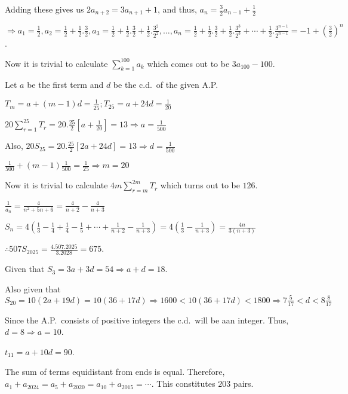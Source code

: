  Adding these gives us $2a_{n + 2} = 3a_{n + 1} + 1$, and thus, $a_n = \frac{3}{2}a_{n - 1} + \frac{1}{2}$

  $\Rightarrow a_1 = \frac{1}{2}, a_2 = \frac{1}{2} + \frac{1}{2}.\frac{3}{2}, a_3 = \frac{1}{2}
  + \frac{1}{2}.\frac{3}{2} + \frac{1}{2}.\frac{3^2}{2^2}, \ldots, a_n = \frac{1}{2}
  + \frac{1}{2}.\frac{3}{2} + \frac{1}{2}.\frac{3^3}{2^3} + \cdots + \frac{1}{2}.\frac{3^{n - 1}}{2^{n - 1}}
  = -1 + \left(\frac{3}{2}\right)^n$.

  Now it is trivial to calculate $\displaystyle\sum_{k = 1}^{100}a_k$ which comes out to be $3a_{100} -
  100$.
\item Let $a$ be the first term and $d$ be the c.d.\ of the given A.P.

  $T_m = a + (m - 1)d = \frac{1}{25}; T_{25} = a + 24d = \frac{1}{20}$

  $20\displaystyle\sum_{r = 1}^{25}T_r = 20.\frac{25}{2}\left[a + \frac{1}{20}\right] = 13\Rightarrow a
  = \frac{1}{500}$

  Also, $20S_{25} = 20.\frac{25}{2}[2a + 24d] = 13 \Rightarrow d = \frac{1}{500}$

  $\frac{1}{500} + (m - 1)\frac{1}{500} = \frac{1}{25}\Rightarrow m = 20$

  Now it is trivial to calculate $4m\displaystyle\sum_{r = m}^{2m}T_r$ which turns out to be $126$.
\item $\frac{1}{a_n} = \frac{4}{n^2 + 5n + 6} = \frac{4}{n + 2} - \frac{4}{n + 3}$

  $S_n = 4\left(\frac{1}{3} - \frac{1}{4} + \frac{1}{4} - \frac{1}{5} + \cdots + \frac{1}{n + 2}
  - \frac{1}{n + 3}\right) = 4\left(\frac{1}{3} - \frac{1}{n + 3}\right) = \frac{4n}{3(n + 3)}$

  $\therefore 507S_{2025} = \frac{4.507.2025}{3.2028} = 675$.
\item Given that $S_3 = 3a + 3d = 54 \Rightarrow a + d = 18$.

  Also given that $S_{20} = 10(2a + 19d) = 10(36 + 17d)\Rightarrow 1600 < 10(36 + 17d) < 1800 \Rightarrow
  7\frac{5}{17} < d < 8\frac{8}{17}$

  Since the A.P.\ consists of positive integers the c.d.\ will be aan integer. Thus, $d = 8\Rightarrow a =
  10$.

  $t_{11} = a + 10d = 90$.
\item The sum of terms equidistant from ends is equal. Therefore, $a_1 + a_{2024} = a_5 + a_{2020} = a_{10}
  + a_{2015} = \cdots$. This constitutes $203$ pairs.


